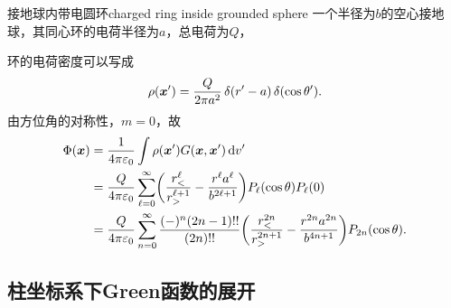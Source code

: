 \begin{example}{接地球内带电圆环}{charged ring inside grounded sphere}
    一个半径为$b$的空心接地球，其同心环的电荷半径为$a$，总电荷为$Q$，

    环的电荷密度可以写成
    \[
        \rho(\bm x')=\frac Q{2\pi a^2}\mathop{}\!\delta(r'-a)\mathop{}\!\delta(\cos\theta').
    \]
    由方位角的对称性，$m=0$，故
    \begin{align*}
        \Phi(\bm x)&=\frac1{4\pi\varepsilon_0}\int\rho(\bm x')G(\bm x,\bm x')\mathop{}\!\mathrm{d} v'\\
        &=\frac Q{4\pi\varepsilon_0}\sum_{\ell=0}^\infty\biggl(\frac{r_<^\ell}{r_>^{\ell+1}}-\frac{r^\ell a^\ell}{b^{2\ell+1}}\biggr)P_\ell(\cos\theta)P_\ell(0)\\
        &=\frac Q{4\pi\varepsilon_0}\sum_{n=0}^\infty\frac{(-)^n(2n-1)!!}{(2n)!!}\biggl(\frac{r_<^{2n}}{r_>^{2n+1}}-\frac{r^{2n}a^{2n}}{b^{4n+1}}\biggr)P_{2n}(\cos\theta).
    \end{align*}
\end{example}

\subsection{柱坐标系下Green函数的展开}
\label{ssec: Green expansion in cylindrical coordinate}

